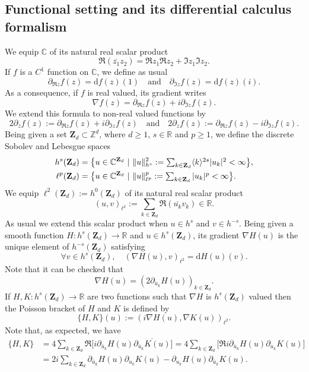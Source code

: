 \documentclass[JEP,XML,SOM,Unicode,NoEqCountersInSection,published]{cedram}
\let\ts\textstyle
\theoremstyle{definition}
\begin{document}
\subsection{Functional setting and its differential calculus formalism}
We equip $\mathbb{C}$ of its natural real scalar product
\[
\Re (\overline{z_1} z_2) = \Re z_1 \Re z_2 + \Im z_1 \Im z_2.
\]
If $f$ is a $C^1$ function on $\mathbb{C}$, we define as usual
\[
\partial_{\Re z} f(z) = \mathrm{d}f(z)(1) \quad \text{and} \quad \partial_{\Im z} f(z) = \mathrm{d}f(z)(i).
\]
As a consequence, if $f$ is real valued, its gradient writes
\[
\nabla f(z) = \partial_{\Re z} f(z) + i \partial_{\Im z} f(z).
\]
We extend this formula to non-real valued functions by
\[
2 \partial_{\bar{z}} f(z):= \partial_{\Re z} f(z) + i \partial_{\Im z} f(z) \quad \text{and} \quad 2 \partial_{z} f(z):= \partial_{\Re z} f(z) - i \partial_{\Im z} f(z).
\]
Being given a set $\mathbf{Z}_d \subset \mathbb{Z}^d$, where $d\geq 1$, $s\in \mathbb{R}$ and $p\geq 1$, we define the discrete Sobolev and Lebesgue spaces
\begin{align}
\label{eq_def_hs}
h^s(\mathbf{Z}_d)&=\big\{ u\in \mathbb{C}^{\mathbf{Z}_d} \ | \ \|u\|_{h^s}^2:= \ts\sum_{ k \in \mathbf{Z}_d} \langle k \rangle^{2s} |u_k|^2 < \infty \big\},\\
\ell^p(\mathbf{Z}_d)&=\big\{ u\in \mathbb{C}^{\mathbf{Z}_d} \ | \ \|u\|_{\ell^p}^p:= \ts\sum_{ k \in \mathbf{Z}_d} |u_k|^p < \infty \big\}.\notag
\end{align}
We equip $\ell^2(\mathbf{Z}_d):= h^0(\mathbf{Z}_d)$ of its natural real scalar product
\[
(u,v)_{\ell^2}:= \sum_{k\in \mathbf{Z}_d} \Re (\overline{u_k} v_k) \in \mathbb{R}.
\]
As usual we extend this scalar product when $u\in h^s$ and $v\in h^{-s}$.
Being given a smooth function $H: h^s(\mathbf{Z}_d) \to \mathbb{R}$ and $u\in h^s(\mathbf{Z}_d)$, its gradient $\nabla H(u)$ is the unique element of $h^{-s}(\mathbf{Z}_d)$ satisfying
\[
\forall v\in h^{s}(\mathbf{Z}_d), \quad (\nabla H(u),v)_{\ell^2} = \mathrm{d}H(u)(v).
\]
Note that it can be checked that
\[
\nabla H(u) = (2\partial_{\overline{u}_k} H(u))_{k\in \mathbf{Z}_d}.
\]
If $H,K: h^s(\mathbf{Z}_d) \to \mathbb{R}$ are two functions such that $\nabla H$ is $h^{s}(\mathbf{Z}_d)$ valued then the Poisson bracket of $H$ and $K$ is defined by
\[
\{ H,K\}(u):= (i \nabla H(u),\nabla K(u))_{\ell^2}.
\]
Note that, as expected, we have
\begin{equation}\label{eq_poisson_coord}
\begin{split}
\{ H,K\} &= 4 \sum_{k\in \mathbf{Z}_d} \Re \big[i\partial_{\bar{u}_k}H(u) \overline{\partial_{\bar{u}_k} K(u)} \big]= 4 \sum_{k\in \mathbf{Z}_d} \big[\Re i\partial_{\bar{u}_k}H(u) \partial_{u_k} K(u)\big] \\
&=2i \sum_{k\in \mathbf{Z}_d} \partial_{\bar{u}_k}H(u) \partial_{u_k} K(u) - \partial_{u_k}H(u) \partial_{\bar{u}_k} K(u).
\end{split}
\end{equation}
\end{document}
